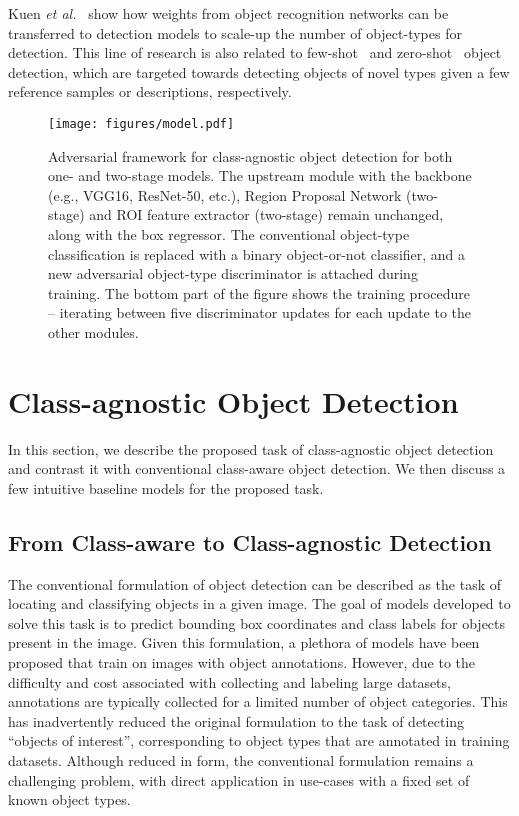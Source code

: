 \documentclass[10pt,twocolumn,letterpaper]{article}
\begin{document}
Kuen \textit{et al.}~\cite{bib:scaling_obj_det} show how weights from object recognition networks can be transferred to detection models to scale-up the number of object-types for detection. This line of research is also related to few-shot~\cite{bib:incremental_obj_det,bib:fsd_1,bib:fsd_2,bib:fsd_3,bib:fsd_4,bib:fsd_5,bib:fsd_6} and zero-shot~\cite{bib:zsd_1,bib:zsd_2,bib:zsd_3} object detection, which are targeted towards detecting objects of novel types given a few reference samples or descriptions, respectively.
 \begin{figure*}
    \centering
    \texttt{[image: figures/model.pdf]}
    \caption{Adversarial framework for class-agnostic object detection for both one- and two-stage models. The upstream module with the backbone (e.g., VGG16, ResNet-50, etc.), Region Proposal Network (two-stage) and ROI feature extractor (two-stage) remain unchanged, along with the box regressor. The conventional object-type classification is replaced with a binary object-or-not classifier, and a new adversarial object-type discriminator is attached during training. The bottom part of the figure shows the training procedure -- iterating between five discriminator updates for each update to the other modules.}
    \label{fig:model}
    \vspace{-5pt}
\end{figure*}

\section{Class-agnostic Object Detection}
\label{sec:caod}

In this section, we describe the proposed task of class-agnostic object detection and contrast it with conventional class-aware object detection. We then discuss a few intuitive baseline models for the proposed task.

\subsection{From Class-aware to Class-agnostic Detection}

The conventional formulation of object detection can be described as the task of locating and classifying objects in a given image. The goal of models developed to solve this task is to predict bounding box coordinates and class labels for objects present in the image. Given this formulation, a plethora of models have been proposed that train on images with object annotations. However, due to the difficulty and cost associated with collecting and labeling large datasets, annotations are typically collected for a limited number of object categories. This has inadvertently reduced the original formulation to the task of detecting ``objects of interest'', corresponding to object types that are annotated in training datasets. Although reduced in form, the conventional formulation remains a challenging problem, with direct application in use-cases with a fixed set of known object types.
\end{document}
